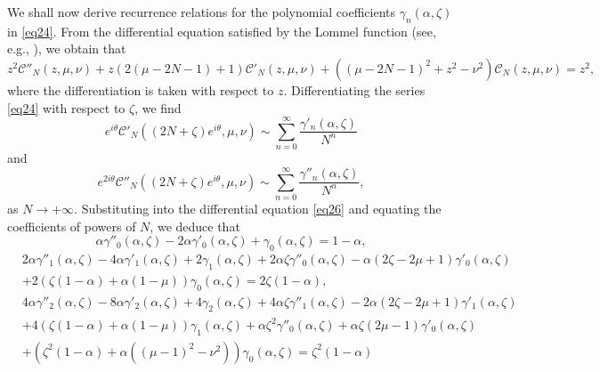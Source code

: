 \documentclass[a4paper,twoside,10pt]{amsart}
\numberwithin{equation}{section}
\begin{document}
We shall now derive recurrence relations for the polynomial coefficients $\gamma _n \left( {\alpha, \zeta} \right)$ in \eqref{eq24}. From the differential equation satisfied by the Lommel function (see, e.g., \cite[11.9.E1]{NIST}), we obtain that
\begin{equation}\label{eq26}
z^2 \mathscr{C}''_N \left( {z,\mu ,\nu } \right) + z\left( {2\left( {\mu  - 2N - 1} \right) + 1} \right)\mathscr{C}'_N \left( {z,\mu ,\nu } \right) + \left( {\left( {\mu  - 2N - 1} \right)^2  + z^2  - \nu ^2 } \right)\mathscr{C}_N \left( {z,\mu ,\nu } \right) = z^2 ,
\end{equation}
where the differentiation is taken with respect to $z$. Differentiating the series \eqref{eq24} with respect to $\zeta$, we find
\[
e^{i\theta } \mathscr{C}'_N \left( {\left( {2N + \zeta } \right)e^{i\theta } ,\mu ,\nu } \right) \sim \sum\limits_{n = 0}^\infty  {\frac{{\gamma '_n \left( {\alpha ,\zeta } \right)}}{{N^n }}}
\]
and
\[
e^{2i\theta } \mathscr{C}''_N \left( {\left( {2N + \zeta } \right)e^{i\theta } ,\mu ,\nu } \right) \sim \sum\limits_{n = 0}^\infty  {\frac{{\gamma ''_n \left( {\alpha ,\zeta } \right)}}{{N^n }}} ,
\]
as $N\to +\infty$. Substituting into the differential equation \eqref{eq26} and equating the coefficients of powers of $N$, we deduce that
\[
\alpha \gamma ''_0 \left( {\alpha ,\zeta } \right) - 2\alpha \gamma '_0 \left( {\alpha ,\zeta } \right) + \gamma _0 \left( {\alpha ,\zeta } \right) = 1 - \alpha, 
\]
\begin{align*}
& 2\alpha \gamma ''_1 \left( {\alpha ,\zeta } \right) - 4\alpha \gamma '_1 \left( {\alpha ,\zeta } \right) + 2\gamma _1 \left( {\alpha ,\zeta } \right) + 2\alpha \zeta \gamma ''_0 \left( {\alpha ,\zeta } \right) - \alpha \left( {2\zeta  - 2\mu  + 1} \right)\gamma '_0 \left( {\alpha ,\zeta } \right) \\ &+ 2\left( {\zeta \left( {1 - \alpha } \right) + \alpha \left( {1 - \mu } \right)} \right)\gamma _0 \left( {\alpha ,\zeta } \right) = 2\zeta \left( {1 - \alpha } \right),
\end{align*}
\begin{align*}
& 4\alpha \gamma ''_2 \left( {\alpha ,\zeta } \right) - 8\alpha \gamma '_2 \left( {\alpha ,\zeta } \right) + 4\gamma _2 \left( {\alpha ,\zeta } \right) + 4\alpha \zeta \gamma ''_1 \left( {\alpha ,\zeta } \right) - 2\alpha \left( {2\zeta  - 2\mu  + 1} \right)\gamma '_1 \left( {\alpha ,\zeta } \right) \\ &+ 4\left( {\zeta \left( {1 - \alpha } \right) + \alpha \left( {1 - \mu } \right)} \right)\gamma _1 \left( {\alpha ,\zeta } \right) + \alpha \zeta ^2 \gamma ''_0 \left( {\alpha ,\zeta } \right) + \alpha \zeta \left( {2\mu  - 1} \right)\gamma '_0 \left( {\alpha ,\zeta } \right) \\ &+ \left( {\zeta ^2 \left( {1 - \alpha } \right) + \alpha \left( {\left( {\mu  - 1} \right)^2  - \nu ^2 } \right)} \right)\gamma _0 \left( {\alpha ,\zeta } \right) = \zeta ^2 \left( {1 - \alpha } \right)
\end{align*}
\end{document}
